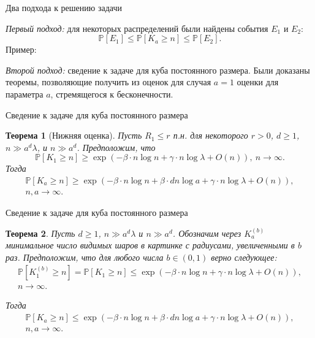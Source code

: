 \documentclass[aspectratio=1610]{beamer}
\theoremstyle{plain}
\newtheorem{thm}{Теорема} %
\theoremstyle{definition}
\theoremstyle{remark}
\def\geq{\geqslant}
\def\leq{\leqslant}
\newcommand{\PP}{\mathbb{P}}
\begin{document}
\begin{frame}{Два подхода к решению задачи}

{\it Первый подход:} для некоторых распределений были найдены события $E_1$ и $E_2$:
$$\PP[E_1] \leq \PP[K_a \geq n] \leq \PP[E_2].$$
Пример:


{\it Второй подход:} сведение к задаче для куба постоянного размера. Были доказаны теоремы, позволяющие получить из оценок для случая $a=1$ оценки для параметра $a$, стремящегося к бесконечности.
    
\end{frame}

\begin{frame}{Сведение к задаче для куба постоянного размера}

\begin{thm}[Нижняя оценка]
    Пусть $R_1\leq r$ п.н. для некоторого $r>0$, $d\geq 1$, $n \gg a^d\lambda$, и $n\gg a^d$. 
Предположим, что 
\begin{equation*}
    \PP[K_1 \geq n] \geq \exp \left(-\beta\cdot n\log n + \gamma\cdot n\log\lambda + O(n)\right),\  n \to \infty.
 \end{equation*}{}
Тогда 
\begin{multline*}
    \PP[K_a \geq n] \geq \exp \left(-\beta\cdot n\log n + \beta\cdot dn\log a + \gamma\cdot n\log\lambda + O(n)\right),\\  n, a \to \infty.
\end{multline*}{}
\end{thm}
    
\end{frame}

\begin{frame}{Сведение к задаче для куба постоянного размера}

\begin{thm}
    Пусть $d\geq 1$,  $n \gg a^d\lambda$ и $n \gg a^d$. Обозначим через $K_a^{(b)}$ минимальное число видимых шаров в картинке с радиусами, увеличенными в $b$ раз.
Предположим, что для любого числа $b \in (0, 1)$ верно следующее:
\begin{multline*}
    \PP[K_1^{(b)} \geq n] =\PP[K_1 \geq n] \leq \exp \left(-\beta\cdot n\log n + \gamma\cdot n\log\lambda + O(n)\right),\\  n \to \infty.
\end{multline*}
    


Тогда 
\begin{multline*}
    \PP[K_a \geq n] \leq \exp \left(-\beta\cdot n\log n + \beta\cdot dn\log a + \gamma\cdot n\log\lambda + O(n)\right),\\  n, a \to \infty.
\end{multline*}{}
\end{thm}
    
\end{frame}
\end{document}
